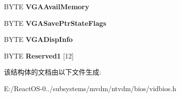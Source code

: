 \begin{DoxyCompactItemize}
B\+Y\+TE {\bfseries V\+G\+A\+Avail\+Memory}
\item 
\mbox{\label{struct___v_g_a___d_y_n_a_m_i_c___f_u_n_c___t_a_b_l_e_a44b088119d3c9c0b9803f29fbb0a440b}} 
B\+Y\+TE {\bfseries V\+G\+A\+Save\+Ptr\+State\+Flags}
\item 
\mbox{\label{struct___v_g_a___d_y_n_a_m_i_c___f_u_n_c___t_a_b_l_e_a1f6869cac3a9c0c9f5a6fb5f020f6d5f}} 
B\+Y\+TE {\bfseries V\+G\+A\+Disp\+Info}
\item 
\mbox{\label{struct___v_g_a___d_y_n_a_m_i_c___f_u_n_c___t_a_b_l_e_aec6d4ff97a900ad38e66e565442ae7b2}} 
B\+Y\+TE {\bfseries Reserved1} \mbox{[}12\mbox{]}
\end{DoxyCompactItemize}


该结构体的文档由以下文件生成\+:\begin{DoxyCompactItemize}
\item 
E\+:/\+React\+O\+S-\/0../subsystems/mvdm/ntvdm/bios/vidbios.\+h\end{DoxyCompactItemize}
